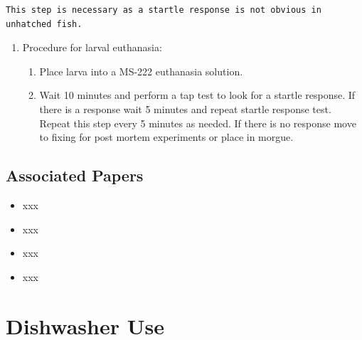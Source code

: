 \documentclass[
  letterpaper,
  DIV=11,
  numbers=noendperiod]{scrreprt}
\providecommand{\tightlist}{%
  \setlength{\itemsep}{0pt}\setlength{\parskip}{0pt}}\usepackage{longtable,booktabs,array}
\begin{document}
\begin{tcolorbox}[enhanced jigsaw, rightrule=.15mm, title=\textcolor{quarto-callout-warning-color}{\faExclamationTriangle}\hspace{0.5em}{NOTES}, titlerule=0mm, opacitybacktitle=0.6, toprule=.15mm, bottomrule=.15mm, opacityback=0, left=2mm, colframe=quarto-callout-warning-color-frame, breakable, coltitle=black, colback=white, colbacktitle=quarto-callout-warning-color!10!white, bottomtitle=1mm, leftrule=.75mm, toptitle=1mm, arc=.35mm]

\begin{verbatim}
This step is necessary as a startle response is not obvious in unhatched fish.
\end{verbatim}

\end{tcolorbox}

\begin{enumerate}
\def\labelenumi{\arabic{enumi}.}
\setcounter{enumi}{1}
\item
  Procedure for larval euthanasia:

  \begin{enumerate}
  \def\labelenumii{\arabic{enumii}.}
  \tightlist
  \item
    Place larva into a MS-222 euthanasia solution.
  \item
    Wait 10 minutes and perform a tap test to look for a startle
    response. If there is a response wait 5 minutes and repeat startle
    response test. Repeat this step every 5 minutes as needed. If there
    is no response move to fixing for post mortem experiments or place
    in morgue.
  \end{enumerate}
\end{enumerate}

\hypertarget{associated-papers-26}{%
\section{Associated Papers}\label{associated-papers-26}}

\begin{itemize}
\tightlist
\item
  xxx
\item
  xxx
\item
  xxx
\item
  xxx
\end{itemize}

\hypertarget{sec-husbandry-dishwasher}{%
\chapter{Dishwasher Use}\label{sec-husbandry-dishwasher}}
\end{document}

